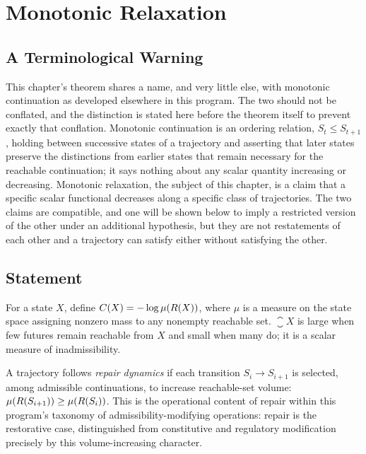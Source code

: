 \chapter{Monotonic Relaxation}
\label{ch:relaxation}

\section{A Terminological Warning}

This chapter's theorem shares a name, and very little else, with
monotonic continuation as developed elsewhere in this program. The two
should not be conflated, and the distinction is stated here before the
theorem itself to prevent exactly that conflation. Monotonic
continuation is an ordering relation, $S_t \le S_{t+1}$, holding between
successive states of a trajectory and asserting that later states
preserve the distinctions from earlier states that remain necessary for
the reachable continuation; it says nothing about any scalar quantity
increasing or decreasing. Monotonic relaxation, the subject of this
chapter, is a claim that a specific scalar functional decreases along a
specific class of trajectories. The two claims are compatible, and one
will be shown below to imply a restricted version of the other under an
additional hypothesis, but they are not restatements of each other and
a trajectory can satisfy either without satisfying the other.

\section{Statement}

\begin{definition}
For a state $X$, define $C(X) = -\log \mu(R(X))$, where
$\mu$ is a measure on the state space assigning nonzero mass to any
nonempty reachable set. $\closure{X}$ is large when few futures remain
reachable from $X$ and small when many do; it is a scalar measure of
inadmissibility.
\end{definition}

\begin{definition}
A trajectory follows \emph{repair dynamics} if each transition
$S_i \to S_{i+1}$ is selected, among admissible continuations, to
increase reachable-set volume: $\mu(R(S_{i+1})) \ge
\mu(R(S_i))$. This is the operational content of repair within this
program's taxonomy of admissibility-modifying operations: repair is
the restorative case, distinguished from constitutive and regulatory
modification precisely by this volume-increasing character.
\end{definition}

